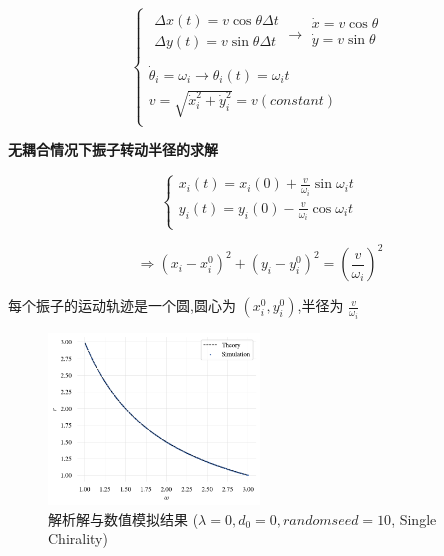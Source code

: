 \documentclass{article}
\begin{document}
$$
\begin{cases}
	\begin{array}{c}
	\Delta x\left( t \right) =v\cos \theta \Delta t\\
	\Delta y\left( t \right) =v\sin \theta \Delta t\\
\end{array}\rightarrow \begin{array}{c}
	\dot{x}=v\cos \theta\\
	\dot{y}=v\sin \theta\\
\end{array}\\
	\dot{\theta}_i=\omega _i\rightarrow \theta _i\left( t \right) =\omega _it\\
	v=\sqrt{\dot{x}_{i}^{2}+\dot{y}_{i}^{2}}=v\left( constant \right)\\
\end{cases}
$$

\textbf{无耦合情况下振子转动半径的求解}

$$
\begin{cases}
	x_i\left( t \right) =x_i\left( 0 \right) +\frac{v}{\omega _i}\sin \omega _it\\
	y_i\left( t \right) =y_i\left( 0 \right) -\frac{v}{\omega _i}\cos \omega _it\\
\end{cases}
$$

$$
\Rightarrow \left( x_i-x_{i}^{0} \right) ^2+\left( y_i-y_{i}^{0} \right) ^2=\left( \frac{v}{\omega _i} \right) ^2
$$

每个振子的运动轨迹是一个圆,圆心为 $\left( x_i^0,y_i^0 \right)$,半径为 $\frac{v}{\omega _i}$

\begin{figure}[H]
	\centering
	\includegraphics[width=0.5\textwidth]{./figs/noCouplingRadius.png}
	\caption{解析解与数值模拟结果 ($\lambda=0, d_0=0, random seed=10$, Single Chirality)}
	\label{fig:fig21.1}
\end{figure}
\end{document}
